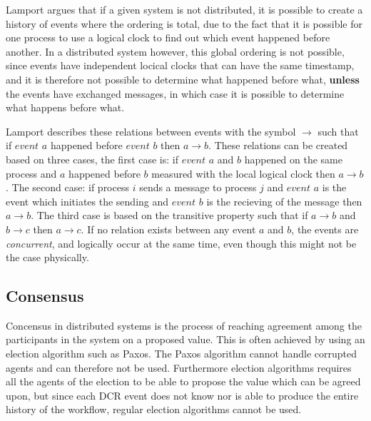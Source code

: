 		\newpar Lamport argues that if a given system is not distributed, it is possible to create a history of events where the ordering is total, due to the fact that it is possible for one process to use a logical clock to find out which event happened before another. In a distributed system however, this global ordering is not possible, since events have independent locical clocks that can have the same timestamp, and it is therefore not possible to determine what happened before what, \textbf{unless} the events have exchanged messages, in which case it is possible to determine what happens before what.
		
		\newpar Lamport describes these relations between events with the symbol $\rightarrow$ such that if $event$ $a$ happened before $event$ $b$ then $a \rightarrow b$. These relations can be created based on three cases, the first case is: if $event$ $a$ and $b$ happened on the same process and $a$ happened before $b$ measured with the local logical clock then $a \rightarrow b$. The second case: if process $i$ sends a message to process $j$ and $event$ $a$ is the event which initiates the sending and $event$ $b$ is the recieving of the message then $a \rightarrow b$. The third case is based on the transitive property such that if $a \rightarrow b$ and $b \rightarrow c$ then $a \rightarrow c$. If no relation exists between any event $a$ and $b$, the events are \textit{concurrent}, and logically  occur at the same time, even though this might not be the case physically. 
		
		
		\subsection{Consensus}
		Concensus in distributed systems is the process of reaching agreement among the participants in the system on a proposed value. This is often achieved by using an election algorithm such as Paxos\cite{Lamport:1998:PP:279227.279229}. The Paxos algorithm cannot handle corrupted agents and can therefore not be used. Furthermore election algorithms requires all the agents of the election to be able to propose the value which can be agreed upon, but since each DCR event does not know nor is able to produce the entire history of the workflow, regular election algorithms cannot be used. 
		
